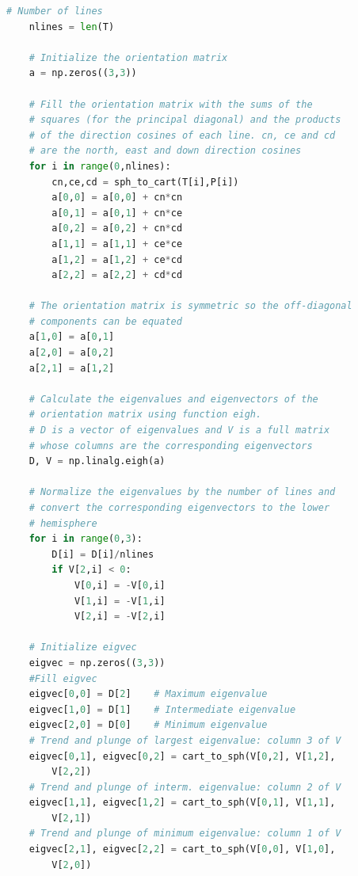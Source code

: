 \documentclass[a4paper , 12pt]{book}
\begin{document}
\begin{center}
\begin{lstlisting}[language=Python, frame=single]
	# Number of lines
	nlines = len(T)
	
	# Initialize the orientation matrix
	a = np.zeros((3,3))
	
	# Fill the orientation matrix with the sums of the
	# squares (for the principal diagonal) and the products
	# of the direction cosines of each line. cn, ce and cd
	# are the north, east and down direction cosines
	for i in range(0,nlines): 
		cn,ce,cd = sph_to_cart(T[i],P[i])
		a[0,0] = a[0,0] + cn*cn
		a[0,1] = a[0,1] + cn*ce
		a[0,2] = a[0,2] + cn*cd
		a[1,1] = a[1,1] + ce*ce
		a[1,2] = a[1,2] + ce*cd
		a[2,2] = a[2,2] + cd*cd
	
	# The orientation matrix is symmetric so the off-diagonal
	# components can be equated
	a[1,0] = a[0,1]
	a[2,0] = a[0,2]
	a[2,1] = a[1,2]
	
	# Calculate the eigenvalues and eigenvectors of the
	# orientation matrix using function eigh.
	# D is a vector of eigenvalues and V is a full matrix
	# whose columns are the corresponding eigenvectors
	D, V = np.linalg.eigh(a)
	
	# Normalize the eigenvalues by the number of lines and
	# convert the corresponding eigenvectors to the lower
	# hemisphere
	for i in range(0,3): 
		D[i] = D[i]/nlines
		if V[2,i] < 0:
			V[0,i] = -V[0,i]
			V[1,i] = -V[1,i]
			V[2,i] = -V[2,i]
	
	# Initialize eigvec
	eigvec = np.zeros((3,3))
	#Fill eigvec
	eigvec[0,0] = D[2]	  # Maximum eigenvalue
	eigvec[1,0] = D[1]	  # Intermediate eigenvalue
	eigvec[2,0] = D[0]	  # Minimum eigenvalue
	# Trend and plunge of largest eigenvalue: column 3 of V
	eigvec[0,1], eigvec[0,2] = cart_to_sph(V[0,2], V[1,2], 
		V[2,2])
	# Trend and plunge of interm. eigenvalue: column 2 of V
	eigvec[1,1], eigvec[1,2] = cart_to_sph(V[0,1], V[1,1], 
		V[2,1])
	# Trend and plunge of minimum eigenvalue: column 1 of V
	eigvec[2,1], eigvec[2,2] = cart_to_sph(V[0,0], V[1,0], 
		V[2,0])
	

\end{lstlisting}
\end{center}
\end{document}
